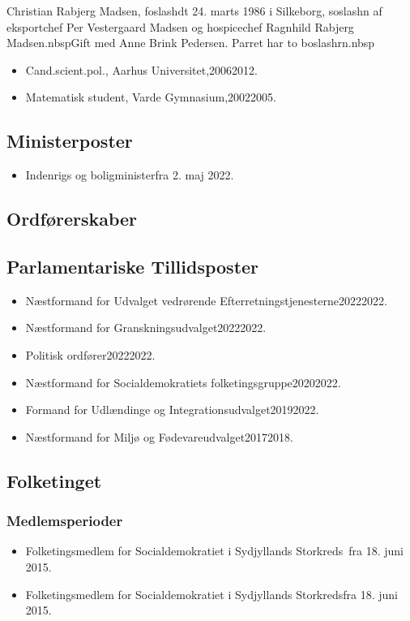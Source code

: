 \documentclass[11pt, a4paper]{awesome-cv}
\begin{document}
\makecvheader[R]
\makelettertitle
\begin{cvletter}
Christian Rabjerg Madsen, foslashdt 24. marts 1986 i Silkeborg, soslashn af eksportchef Per Vestergaard Madsen og hospicechef Ragnhild Rabjerg Madsen.nbspGift med Anne Brink Pedersen. Parret har to boslashrn.nbsp

\begin{itemize}
\item Cand.scient.pol., Aarhus Universitet,20062012.
\item Matematisk student, Varde Gymnasium,20022005.
\end{itemize}
\subsection*{Ministerposter}
\begin{itemize}
\item Indenrigs og boligministerfra 2. maj 2022.
\end{itemize}
\subsection*{Ordførerskaber}
\begin{itemize}
\end{itemize}
\subsection*{Parlamentariske Tillidsposter}
\begin{itemize}
\item Næstformand for Udvalget vedrørende Efterretningstjenesterne20222022.
\item Næstformand for Granskningsudvalget20222022.
\item Politisk ordfører20222022.
\item Næstformand for Socialdemokratiets folketingsgruppe20202022.
\item Formand for Udlændinge og Integrationsudvalget20192022.
\item Næstformand for Miljø og Fødevareudvalget20172018.
\end{itemize}
\subsection*{Folketinget}
\subsubsection*{Medlemsperioder}
\begin{itemize}
\item Folketingsmedlem for Socialdemokratiet i Sydjyllands Storkreds fra 18. juni 2015.
\item Folketingsmedlem for Socialdemokratiet i Sydjyllands Storkredsfra 18. juni 2015.
\end{itemize}

\end{cvletter}
\end{document}
